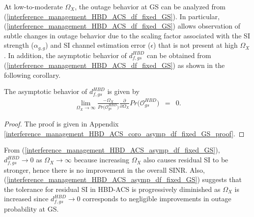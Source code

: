 At low-to-moderate $\Omega_X$, the outage behavior at GS can be analyzed from (\ref{interference_management_HBD_ACS_df_fixed_GS}). In particular, (\ref{interference_management_HBD_ACS_df_fixed_GS}) allows observation of subtle changes in outage behavior due to the scaling factor associated with the SI strength ($\alpha_{g,g}$) and SI channel estimation error ($\epsilon$) that is not present at high $\Omega_X$. In addition, the asymptotic behavior of $d_{f,gs}^{HBD}$ can be obtained from (\ref{interference_management_HBD_ACS_df_fixed_GS}) as shown in the following corollary.

\begin{corollary} \label{interference_management_HBD_ACS_coro_asymp_df_fixed_GS}
The asymptotic behavior of $d_{f,gs}^{HBD}$ is given by
\begin{eqnarray} \label{interference_management_HBD_ACS_asymp_df_fixed_GS}
\lim_{\Omega_X\to\infty} \frac{-\Omega_X}{Pr\big(\mathcal{O}_{gs}^{HBD}\big)}\frac{\partial}{\partial\Omega_X}Pr\big(\mathcal{O}_{gs}^{HBD}\big) & = & 0.
\end{eqnarray}
\begin{proof}
The proof is given in Appendix \ref{interference_management_HBD_ACS_coro_asymp_df_fixed_GS_proof}.
\end{proof}
\end{corollary}

From (\ref{interference_management_HBD_ACS_asymp_df_fixed_GS}), $d_{f,gs}^{HBD} \to 0$ as $\Omega_X \to \infty$ because increasing $\Omega_X$ also causes residual SI to be stronger, hence there is no improvement in the overall SINR. Also, (\ref{interference_management_HBD_ACS_asymp_df_fixed_GS}) suggests that the tolerance for residual SI in HBD-ACS is progressively diminished as $\Omega_X$ is increased since $d_{f,gs}^{HBD} \to 0$ corresponds to negligible improvements in outage probability at GS.

